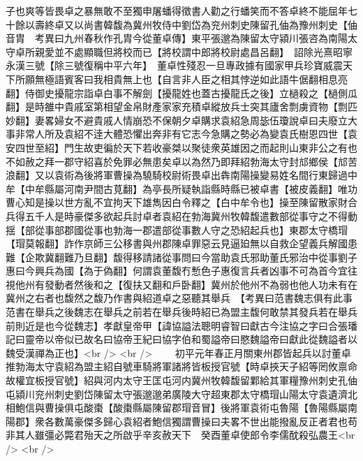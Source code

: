 子也爽等皆畏卓之暴無敢不至獨申屠蟠得徵書人勸之行蟠笑而不答卓終不能屈年七十餘以壽終卓又以尚書韓馥為冀州牧侍中劉岱為兖州刺史陳留孔伷為豫州刺史【伷音胄　考異曰九州春秋作孔胄今從董卓傳】東平張邈為陳留太守潁川張咨為南陽太守卓所親愛並不處顯職但將校而已【將校謂中郎將校尉處昌呂翻】　詔除光熹昭寧永漢三號【除三號復稱中平六年】　董卓性殘忍一旦專政據有國家甲兵珍寶威震天下所願無極語賓客曰我相貴無上也【自言非人臣之相其悖逆如此語牛倨翻相息亮翻】侍御史擾龍宗詣卓白事不解劍【擾龍姓也蓋古擾龍氏之後】立檛殺之【檛側瓜翻】是時雒中貴戚室第相望金帛財產家家充積卓縱放兵士突其廬舍剽虜資物【剽匹妙翻】妻畧婦女不避貴戚人情崩恐不保朝夕卓購求袁紹急周毖伍瓊說卓曰夫廢立大事非常人所及袁紹不逹大體恐懼出奔非有它志今急購之勢必為變袁氏樹恩四世【袁安四世至紹】門生故吏徧於天下若收豪桀以聚徒衆英雄因之而起則山東非公之有也不如赦之拜一郡守紹喜於免罪必無患矣卓以為然乃即拜紹勃海太守封邟鄉侯【邟苦浪翻】又以袁術為後將軍曹操為驍騎校尉術畏卓出犇南陽操變易姓名間行東歸過中牟【中牟縣屬河南尹間古莧翻】為亭長所疑執詣縣時縣已被卓書【被皮義翻】唯功曹心知是操以世方亂不宜拘天下雄雋因白令釋之【白中牟令也】操至陳留散家財合兵得五千人是時豪傑多欲起兵討卓者袁紹在勃海冀州牧韓馥遣數部從事守之不得動揺【部從事部郡國從事也勃海一郡遣部從事數人守之恐紹起兵也】東郡太守橋瑁【瑁莫報翻】詐作京師三公移書與州郡陳卓罪惡云見逼廹無以自救企望義兵解國患難【企欺冀翻難乃旦翻】馥得移請諸從事問曰今當助袁氏邪助董氏邪治中從事劉子惠曰今興兵為國【為于偽翻】何謂袁董馥冇慙色子惠復言兵者凶事不可為首今宜往視他州有發動者然後和之【復扶又翻和戶卧翻】冀州於他州不為弱也他人功未有在冀州之右者也馥然之馥乃作書與紹道卓之惡聽其舉兵　【考異曰范書魏志俱有此事范書在舉兵之後魏志在舉兵之前若在舉兵後時紹已為盟主馥何敢禁其發兵若在舉兵前則近是也今從魏志】孝獻皇帝甲【諱協謚法聰明睿智曰獻古今注協之字曰合張璠記曰靈帝以帝似已故名曰協帝王紀曰協字伯和蜀謚帝曰愍魏謚帝曰獻此從魏謚者以魏受漢禪為正也】<br />
<br />
　　初平元年春正月關東州郡皆起兵以討董卓推勃海太守袁紹為盟主紹自號車騎將軍諸將皆板授官號【時卓挾天子紹等罔攸禀命故權宜板授官號】紹與河内太守王匡屯河内冀州牧韓馥留鄴給其軍糧豫州刺史孔伷屯潁川兖州刺史劉岱陳留太守張邈邈弟廣陵大守超東郡太守橋瑁山陽太守袁遺濟北相鮑信與曹操俱屯酸棗【酸棗縣屬陳留郡瑁音冒】後將軍袁術屯魯陽【魯陽縣屬南陽郡】衆各數萬豪傑多歸心袁紹者鮑信獨謂曹操曰夫畧不世出能撥亂反正者君也苟非其人雖彊必斃君殆天之所啟乎辛亥赦天下　癸酉董卓使郎令李儒酖殺弘農王<br />
<br />

